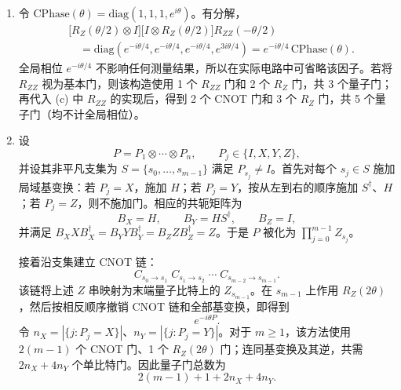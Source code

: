 \documentclass{ctexart}
\begin{document}
\begin{enumerate}
    \item[(d)] 令 $\mathrm{CPhase}(\theta)=\mathrm{diag}(1,1,1,e^{i\theta})$。有分解，
    \begin{align*}
        &\bigl[R_Z(\theta/2)\otimes I\bigr]
        \bigl[I\otimes R_Z(\theta/2)\bigr]R_{ZZ}(-\theta/2) \\
        &\quad = \mathrm{diag}\!\left(e^{-i\theta/4},e^{-i\theta/4},e^{-i\theta/4},e^{3i\theta/4}\right)
        =e^{-i\theta/4}\,\mathrm{CPhase}(\theta).
    \end{align*}
    全局相位 $e^{-i\theta/4}$ 不影响任何测量结果，所以在实际电路中可省略该因子。若将 $R_{ZZ}$ 视为基本门，则该构造使用 1 个 $R_{ZZ}$ 门和 2 个 $R_Z$ 门，共 3 个量子门；再代入 (c) 中 $R_{ZZ}$ 的实现后，得到 2 个 CNOT 门和 3 个 $R_Z$ 门，共 5 个量子门（均不计全局相位）。

    \item[(e)] 设
    \begin{equation*}
        P=P_1\otimes\cdots\otimes P_n,\qquad P_j\in\{I,X,Y,Z\},
    \end{equation*}
    并设其非平凡支集为 $S=\{s_0,\ldots,s_{m-1}\}$ 满足 $P_{s_j}\neq I$。首先对每个 $s_j\in S$ 施加局域基变换：若 $P_j=X$，施加 $H$；若 $P_j=Y$，按从左到右的顺序施加 $S^\dagger$、$H$；若 $P_j=Z$，则不施加门。相应的共轭矩阵为
    \begin{equation*}
        B_X=H,\qquad B_Y=HS^\dagger,\qquad B_Z=I,
    \end{equation*}
    并满足 $B_X X B_X^\dagger=B_Y Y B_Y^\dagger=B_Z Z B_Z^\dagger=Z$。于是 $P$ 被化为 $\prod_{j=0}^{m-1}Z_{s_j}$。

    接着沿支集建立 CNOT 链：
    \begin{equation*}
        C_{s_0\to s_1}\;C_{s_1\to s_2}\;\cdots\;C_{s_{m-2}\to s_{m-1}}.
    \end{equation*}
    该链将上述 $Z$ 串映射为末端量子比特上的 $Z_{s_{m-1}}$。在 $s_{m-1}$ 上作用 $R_Z(2\theta)$，然后按相反顺序撤销 CNOT 链和全部基变换，即得到
    \begin{equation*}
        e^{-i\theta P}.
    \end{equation*}
    令 $n_X=|\{j:P_j=X\}|$、$n_Y=|\{j:P_j=Y\}|$。对于 $m\geq1$，该方法使用 $2(m-1)$ 个 CNOT 门、1 个 $R_Z(2\theta)$ 门；连同基变换及其逆，共需 $2n_X+4n_Y$ 个单比特门。因此量子门总数为
    \begin{equation*}
        2(m-1)+1+2n_X+4n_Y.
    \end{equation*}


\end{enumerate}
\end{document}
